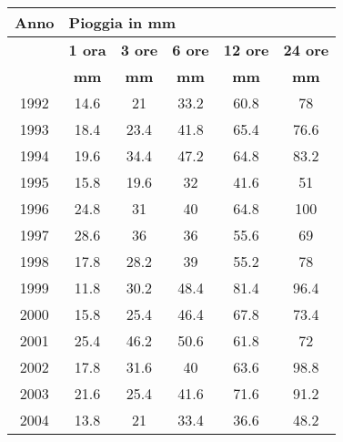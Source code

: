 \begin{table}[H] \centering \footnotesize
\begin{tabular}{cccccc}
\multirow{3}{*}{\textbf{Anno}} & \multicolumn{5}{l}{\textbf{Pioggia in mm}}                                           \\
\toprule
                               & \textbf{1 ora} & \textbf{3 ore} & \textbf{6 ore} & \textbf{12 ore} & \textbf{24 ore} \\
                               & \textbf{mm}    & \textbf{mm}    & \textbf{mm}    & \textbf{mm}     & \textbf{mm}     \\
\midrule
1992                           & 14.6           & 21             & 33.2           & 60.8            & 78              \\
1993                           & 18.4           & 23.4           & 41.8           & 65.4            & 76.6            \\
1994                           & 19.6           & 34.4           & 47.2           & 64.8            & 83.2            \\
1995                           & 15.8           & 19.6           & 32             & 41.6            & 51              \\
1996                           & 24.8           & 31             & 40             & 64.8            & 100             \\
1997                           & 28.6           & 36             & 36             & 55.6            & 69              \\
1998                           & 17.8           & 28.2           & 39             & 55.2            & 78              \\
1999                           & 11.8           & 30.2           & 48.4           & 81.4            & 96.4            \\
2000                           & 15.8           & 25.4           & 46.4           & 67.8            & 73.4            \\
2001                           & 25.4           & 46.2           & 50.6           & 61.8            & 72              \\
2002                           & 17.8           & 31.6           & 40             & 63.6            & 98.8            \\
2003                           & 21.6           & 25.4           & 41.6           & 71.6            & 91.2            \\
2004                           & 13.8           & 21             & 33.4           & 36.6            & 48.2            \\

\end{tabular}
\end{table}
